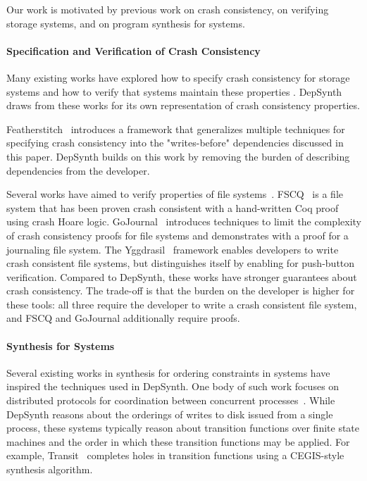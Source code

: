 
Our work is motivated by previous work on crash consistency,
on verifying storage systems, and on program synthesis for systems.

\paragraph{Specification and Verification of Crash Consistency}
Many existing works have explored how to specify crash consistency
for storage systems and how to verify that systems maintain
these properties .
DepSynth draws from these works for its own
representation of crash consistency properties.

Featherstitch~ \cite{frost:featherstitch} introduces a framework that generalizes 
multiple techniques for specifying crash consistency into the
"writes-before" dependencies discussed in this paper.
DepSynth builds on this work by removing the burden of describing
dependencies from the developer.

Several works have aimed to verify properties of file
systems~\cite{amani:cogent,schellhorn:flashix}.
FSCQ~\cite{chen:fscq} is a file system that has been proven crash consistent
with a hand-written Coq proof using crash Hoare logic.
GoJournal~\cite{chajed:go-journal} introduces techniques to limit the complexity of
crash consistency proofs for file systems
and demonstrates with a proof for a journaling file system.
The Yggdrasil~\cite{sigurbjarnarson:yggdrasil} framework enables developers to write crash consistent
file systems, but distinguishes itself by enabling for push-button
verification. Compared to DepSynth, these works have stronger guarantees
about crash consistency.
The trade-off is that the burden on the developer is higher for these tools:
all three require the developer to write a crash consistent file system,
and FSCQ and GoJournal additionally require proofs.

\paragraph{Synthesis for Systems}
Several existing works in synthesis for ordering constraints in systems
have inspired the techniques used in DepSynth.
One body of such work focuses on distributed protocols for coordination
between concurrent processes~\cite{alur:synth-protocols}.
While DepSynth reasons about the orderings of
writes to disk issued from a single process, these systems typically reason about
transition functions over finite state machines and the order
in which these transition functions may be applied.
For example, Transit~\cite{udupa:transit} completes holes in transition functions
using a CEGIS-style synthesis algorithm.

